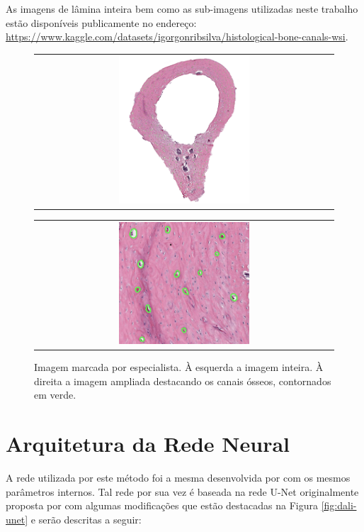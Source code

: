 As imagens de lâmina inteira bem como as sub-imagens utilizadas neste trabalho estão disponíveis publicamente no endereço: \href{https://www.kaggle.com/datasets/igorgonribsilva/histological-bone-canals-wsi}{https://www.kaggle.com/datasets/igorgonribsilva/histological-bone-canals-wsi}.

\begin{figure}[h]
    \center
    \begin{tabular}{@{}c@{}}
        \includegraphics[width=0.45\textwidth]{figures/3_methods/imagem_marcada_inteira.png}
    \end{tabular}
    \begin{tabular}{@{}c@{}}
        \includegraphics[width=0.45\textwidth]{figures/3_methods/imagem_marcada_ampliada.jpg}
    \end{tabular}
  
    \caption[Marcação do especialista para o método proposto.]{Imagem marcada por especialista. À esquerda a imagem inteira. À direita a imagem ampliada destacando os canais ósseos, contornados em verde.}
    \label{fig:labelled-images}
\end{figure}

\section{Arquitetura da Rede Neural}
A rede utilizada por este método foi a mesma desenvolvida por \cite{santos2022automated} com os mesmos parâmetros internos. Tal rede por sua vez é baseada na rede U-Net originalmente proposta por \cite{ronneberger2015u} com algumas modificações que estão destacadas na Figura \ref{fig:dali-unet} e serão descritas a seguir:

